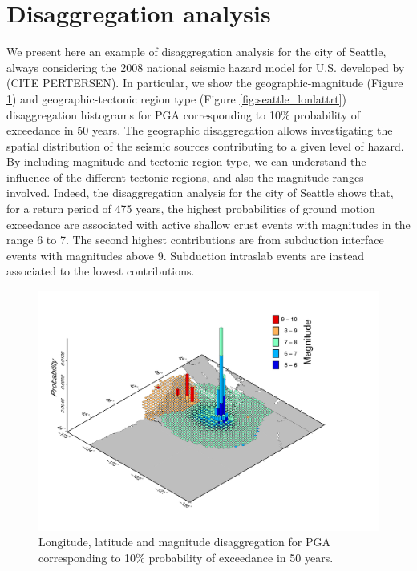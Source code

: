 \section{Disaggregation analysis}
We present here an example of disaggregation analysis for the city of Seattle, always considering the 2008
national seismic hazard model for U.S. developed by (CITE PERTERSEN). In particular, we show the geographic-magnitude (Figure \ref{fig:seattle_lonlatmag}) and geographic-tectonic region type (Figure \ref{fig:seattle_lonlattrt}) disaggregation histograms for PGA corresponding to 10\% probability of exceedance in 50 years. The geographic disaggregation allows investigating the spatial distribution of the
seismic sources contributing to a given level of hazard. By including magnitude and tectonic region type,
we can understand the influence of the different tectonic regions, and also the magnitude ranges involved.
Indeed, the disaggregation analysis for the city of Seattle shows that, for a return period of 475 years, the
highest probabilities of ground motion exceedance are associated with active shallow crust events with magnitudes in the range 6 to 7. The second highest contributions are from subduction interface events
with magnitudes above 9. Subduction intraslab events are instead associated to the lowest contributions.
\begin{figure}
\centering
\includegraphics[width=14cm]{./Pictures/Seattle_Lon_Lat_Mag.pdf}
\caption{Longitude, latitude and magnitude disaggregation for PGA corresponding to 10\% probability of exceedance in 50 years.}
\label{fig:seattle_lonlatmag}
\end{figure}

